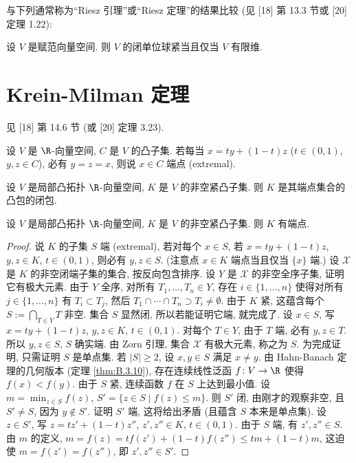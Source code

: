 与下列通常称为``Riesz 引理''或``Riesz 定理''的结果比较 (见 {[}18{]} 第 13.3 节或 {[}20{]} 定理 1.22):

\begin{theorem}[Riesz 定理]
\label{thm:B.4.2}
设 $V$ 是赋范向量空间. 则 $V$ 的闭单位球紧当且仅当 $V$ 有限维.
\end{theorem}

\section{Krein-Milman 定理}
见 {[}18{]} 第 14.6 节 (或 {[}20{]} 定理 3.23).

\begin{definition}
\label{def:B.5.1}
设 $V$ 是 $\R$-向量空间, $C$ 是 $V$ 的凸子集. 若每当 $x = ty + (1 - t)z$ ($t \in (0, 1)$, $y, z \in C$), 必有 $y = z = x$, 则说 $x \in C$ 端点 (extremal).
\end{definition}

\begin{theorem}
\label{thm:B.5.2}
设 $V$ 是局部凸拓扑 $\R$-向量空间, $K$ 是 $V$ 的非空紧凸子集. 则 $K$ 是其端点集合的凸包的闭包.
\end{theorem}

\begin{lemma}[紧凸集的端点]
\label{lem:B.5.3}
设 $V$ 是局部凸拓扑 $\R$-向量空间, $K$ 是 $V$ 的非空紧凸子集. 则 $K$ 有端点.
\end{lemma}

\begin{proof}
说 $K$ 的子集 $S$ 端 (extremal), 若对每个 $x \in S$, 若 $x = ty + (1 - t)z$, $y, z \in K$, $t \in (0, 1)$, 则必有 $y, z \in S$. (注意点 $x \in K$ 端点当且仅当 $\{x\}$ 端.)
设 $\mathcal{X}$ 是 $K$ 的非空闭端子集的集合, 按反向包含排序. 设 $Y$ 是 $\mathcal{X}$ 的非空全序子集, 证明它有极大元素. 由于 $Y$ 全序, 对所有 $T_1, \ldots, T_n \in Y$, 存在 $i \in \{1, \ldots, n\}$ 使得对所有 $j \in \{1, \ldots, n\}$ 有 $T_i \subset T_j$, 然后 $T_1 \cap \cdots \cap T_n \supset T_i \neq \emptyset$. 由于 $K$ 紧, 这蕴含每个 $S := \bigcap_{T \in Y}T$ 非空. 集合 $S$ 显然闭, 所以若能证明它端, 就完成了. 设 $x \in S$, 写 $x = ty + (1 - t)z$, $y, z \in K$, $t \in (0, 1)$. 对每个 $T \in Y$, 由于 $T$ 端, 必有 $y, z \in T$. 所以 $y, z \in S$, $S$ 确实端.
由 Zorn 引理, 集合 $\mathcal{X}$ 有极大元素, 称之为 $S$. 为完成证明, 只需证明 $S$ 是单点集. 若 $|S| \geq 2$, 设 $x, y \in S$ 满足 $x \neq y$. 由 Hahn-Banach 定理的几何版本 (定理 \ref{thm:B.3.10}), 存在连续线性泛函 $f \colon V \to \R$ 使得 $f(x) < f(y)$. 由于 $S$ 紧, 连续函数 $f$ 在 $S$ 上达到最小值. 设 $m = \min_{z \in S}f(z)$, $S' = \{z \in S \mid f(z) \leq m\}$. 则 $S'$ 闭, 由刚才的观察非空, 且 $S' \neq S$, 因为 $y \notin S'$. 证明 $S'$ 端, 这将给出矛盾 (且蕴含 $S$ 本来是单点集). 设 $z \in S'$, 写 $z = tz' + (1 - t)z''$, $z', z'' \in K$, $t \in (0, 1)$. 由于 $S$ 端, 有 $z', z'' \in S$. 由 $m$ 的定义, $m = f(z) = tf(z') + (1 - t)f(z'') \leq tm + (1 - t)m$, 这迫使 $m = f(z') = f(z'')$, 即 $z', z'' \in S'$.
\end{proof}

